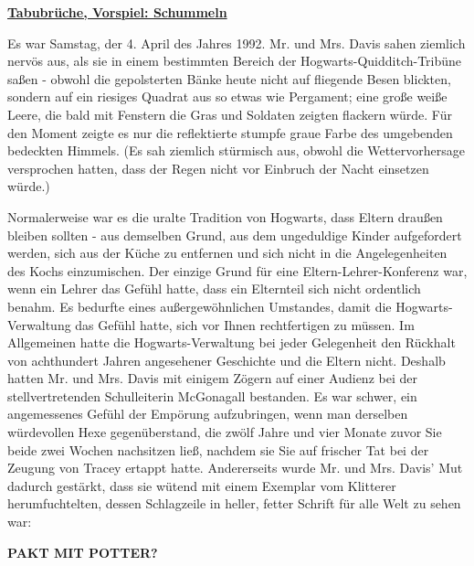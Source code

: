 

\hypertarget{tabubruxfcche-vorspiel-schummeln}{%

\textbf{\uline{Tabubrüche, Vorspiel: Schummeln}}

\hfill\break Es war Samstag, der 4. April des Jahres 1992. Mr. und Mrs. Davis sahen ziemlich nervös aus, als sie in einem bestimmten Bereich der Hogwarts-Quidditch-Tribüne saßen - obwohl die gepolsterten Bänke heute nicht auf fliegende Besen blickten, sondern auf ein riesiges Quadrat aus so etwas wie Pergament; eine große weiße Leere, die bald mit Fenstern die Gras und Soldaten zeigten flackern würde. Für den Moment zeigte es nur die reflektierte stumpfe graue Farbe des umgebenden bedeckten Himmels. (Es sah ziemlich stürmisch aus, obwohl die Wettervorhersage versprochen hatten, dass der Regen nicht vor Einbruch der Nacht einsetzen würde.)

Normalerweise war es die uralte Tradition von Hogwarts, dass Eltern draußen bleiben sollten - aus demselben Grund, aus dem ungeduldige Kinder aufgefordert werden, sich aus der Küche zu entfernen und sich nicht in die Angelegenheiten des Kochs einzumischen. Der einzige Grund für eine Eltern-Lehrer-Konferenz war, wenn ein Lehrer das Gefühl hatte, dass ein Elternteil sich nicht ordentlich benahm. Es bedurfte eines außergewöhnlichen Umstandes, damit die Hogwarts-Verwaltung das Gefühl hatte, sich vor Ihnen rechtfertigen zu müssen. Im Allgemeinen hatte die Hogwarts-Verwaltung bei jeder Gelegenheit den Rückhalt von achthundert Jahren angesehener Geschichte und die Eltern nicht. Deshalb hatten Mr. und Mrs. Davis mit einigem Zögern auf einer Audienz bei der stellvertretenden Schulleiterin McGonagall bestanden. Es war schwer, ein angemessenes Gefühl der Empörung aufzubringen, wenn man derselben würdevollen Hexe gegenüberstand, die zwölf Jahre und vier Monate zuvor Sie beide zwei Wochen nachsitzen ließ, nachdem sie Sie auf frischer Tat bei der Zeugung von Tracey ertappt hatte. Andererseits wurde Mr. und Mrs. Davis' Mut dadurch gestärkt, dass sie wütend mit einem Exemplar vom Klitterer herumfuchtelten, dessen Schlagzeile in heller, fetter Schrift für alle Welt zu sehen war:

\textbf{PAKT MIT POTTER?}

\hfill\break

}
